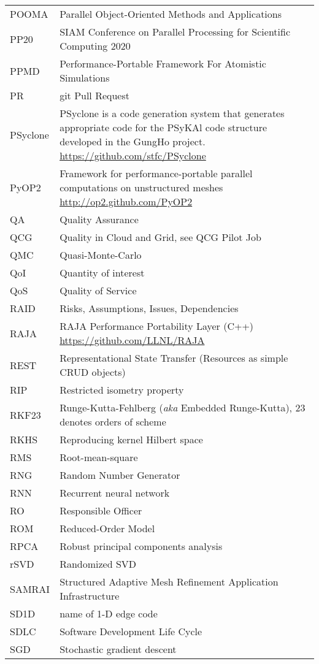 \begin{longtable}{|p{4.0cm}|p{12.0cm}|}
POOMA & Parallel Object-Oriented Methods and Applications \\
PP20 & SIAM Conference on Parallel Processing for Scientific Computing 2020\\
PPMD & Performance-Portable Framework For Atomistic Simulations \\
PR & git Pull Request \\
PSyclone & PSyclone is a code generation system that generates appropriate code for the PSyKAl code structure developed in the GungHo project.  \url{https://github.com/stfc/PSyclone}\\
PyOP2 & Framework for performance-portable parallel computations on unstructured meshes \url{http://op2.github.com/PyOP2}\\
QA & Quality Assurance\\
QCG  & Quality in Cloud and Grid, see QCG Pilot Job\\
QMC & Quasi-Monte-Carlo \\
QoI & Quantity of interest \\
QoS & Quality of Service \\
RAID & Risks, Assumptions, Issues, Dependencies \\
RAJA & RAJA Performance Portability Layer (C++) \url{https://github.com/LLNL/RAJA} \\
REST & Representational State Transfer (Resources as simple CRUD objects) \\
RIP  & Restricted isometry property \\
RKF23 & Runge-Kutta-Fehlberg (\emph{aka} Embedded Runge-Kutta), $23$ denotes orders of scheme\\
RKHS  & Reproducing kernel Hilbert space \\
RMS & Root-mean-square \\
RNG & Random Number Generator\\
RNN  & Recurrent neural network \\
RO & Responsible Officer  \\
ROM & Reduced-Order Model \\
RPCA  & Robust principal components analysis \\
rSVD  & Randomized SVD \\
SAMRAI & Structured Adaptive Mesh Refinement Application Infrastructure\\
SD1D & name of 1-D edge code \\
SDLC & Software Development Life Cycle \\
SGD  & Stochastic gradient descent \\

\end{longtable}

